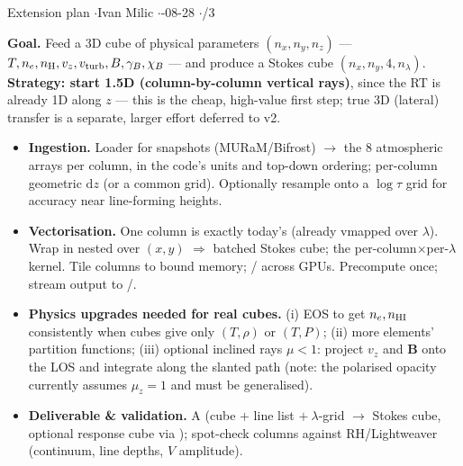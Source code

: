 


%
{Extension plan \quad$\cdot$\quad Ivan Milic \quad$\cdot$-08-28 \quad$\cdot$/3}

\textbf{Goal.} Feed a 3D cube of physical parameters $(n_x,n_y,n_z)$ ---
$T,n_e,n_{\rm H},v_z,v_{\rm turb},B,\gamma_B,\chi_B$ --- and produce a Stokes cube
$(n_x,n_y,4,n_\lambda)$. \textbf{Strategy: start 1.5D (column-by-column vertical rays)}, since the RT
is already 1D along $z$ --- this is the cheap, high-value first step; true 3D (lateral) transfer is a
separate, larger effort deferred to v2.

\begin{itemize}
  \item \textbf{Ingestion.} Loader for snapshots (MURaM/Bifrost) $\to$ the 8 atmospheric arrays per
        column, in the code's units and top-down ordering; per-column geometric $\mathrm{d}z$ (or a common
        grid). Optionally resample onto a $\log\tau$ grid for accuracy near line-forming heights.
  \item \textbf{Vectorisation.} One column is exactly today's  (already vmapped over
        $\lambda$). Wrap in nested  over $(x,y)$ $\Rightarrow$ batched Stokes cube;  the
        per-column$\times$per-$\lambda$ kernel. Tile columns to bound memory; / across GPUs.
        Precompute  once; stream output to /.
  \item \textbf{Physics upgrades needed for real cubes.} (i) EOS to get $n_e,n_{\rm HI}$ consistently when cubes
        give only $(T,\rho)$ or $(T,P)$; (ii) more elements' partition functions; (iii) optional inclined rays
        $\mu<1$: project $v_z$ and $\mathbf{B}$ onto the LOS and integrate along the slanted path (note: the
        polarised opacity currently assumes $\mu_z=1$ and must be generalised).
  \item \textbf{Deliverable \& validation.} A  (cube $+$ line list $+\ \lambda$-grid $\to$ Stokes cube,
        optional response cube via ); spot-check columns against RH/Lightweaver (continuum,
        line depths, $V$ amplitude).
\end{itemize}



